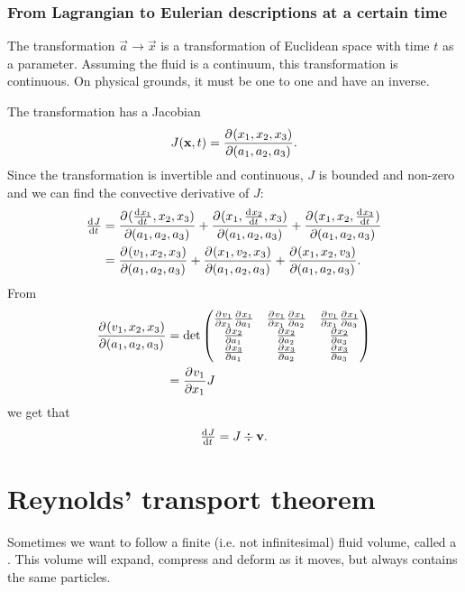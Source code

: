 \subsubsection{From Lagrangian to Eulerian descriptions at a certain time}
The transformation $\vec{a}\to \vec{x}$ is a transformation of Euclidean space with time $t$ as a parameter. Assuming the fluid is a continuum, this transformation is continuous. On physical grounds, it must be one to one and have an inverse.

The transformation has a Jacobian
\[ J(\boldsymbol{\mathrm{x}},t) =  \frac{\partial{^{}}(x_1,x_2, x_3)}{\partial{{(a_1, a_2, a_3)}^{}}} . \]
Since the transformation is invertible and continuous, $J$ is bounded and non-zero and we can find the convective derivative of $J$:
\begin{align*}
\od{J}{t} &= \pd{(\od{x_1}{t},x_2, x_3)}{(a_1, a_2, a_3)}+\pd{(x_1,\od{x_2}{t}, x_3)}{(a_1, a_2, a_3)}+ \pd{(x_1,x_2, \od{x_3}{t})}{(a_1, a_2, a_3)} \\
&= \pd{(v_1,x_2, x_3)}{(a_1, a_2, a_3)} + \pd{(x_1,v_2, x_3)}{(a_1, a_2, a_3)} + \pd{(x_1,x_2, v_3)}{(a_1, a_2, a_3)}.
\end{align*}
From
\begin{align*}
 \frac{\partial{^{}}(v_1,x_2, x_3)}{\partial{{(a_1, a_2, a_3)}^{}}}  &= \det \begin{pmatrix}
 \frac{\partial{^{}}v_1}{\partial{{x_1}^{}}}  \frac{\partial{^{}}x_1}{\partial{{a_1}^{}}}  &  \frac{\partial{^{}}v_1}{\partial{{x_1}^{}}}  \frac{\partial{^{}}x_1}{\partial{{a_2}^{}}}  &  \frac{\partial{^{}}v_1}{\partial{{x_1}^{}}}  \frac{\partial{^{}}x_1}{\partial{{a_3}^{}}}  \\
 \frac{\partial{^{}}x_2}{\partial{{a_1}^{}}}  &  \frac{\partial{^{}}x_2}{\partial{{a_2}^{}}}  &  \frac{\partial{^{}}x_2}{\partial{{a_3}^{}}}  \\
 \frac{\partial{^{}}x_3}{\partial{{a_1}^{}}}  &  \frac{\partial{^{}}x_3}{\partial{{a_2}^{}}}  &  \frac{\partial{^{}}x_3}{\partial{{a_3}^{}}} 
\end{pmatrix} \\
&=  \frac{\partial{^{}}v_1}{\partial{{x_1}^{}}} J
\end{align*}
we get that
\begin{equation}
\od{J}{t} = J \div \vec{v}. \label{eq:convectiveDerivativeJacobian}
\end{equation}


\section{Reynolds' transport theorem}
Sometimes we want to follow a finite (i.e. not infinitesimal) fluid volume, called a . This volume will expand, compress and deform as it moves, but always contains the same particles.

